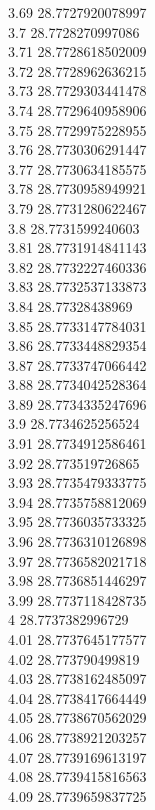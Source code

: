{3.69	28.7727920078997\\
3.7	28.7728270997086\\
3.71	28.7728618502009\\
3.72	28.7728962636215\\
3.73	28.7729303441478\\
3.74	28.7729640958906\\
3.75	28.7729975228955\\
3.76	28.7730306291447\\
3.77	28.7730634185575\\
3.78	28.7730958949921\\
3.79	28.7731280622467\\
3.8	28.7731599240603\\
3.81	28.7731914841143\\
3.82	28.7732227460336\\
3.83	28.7732537133873\\
3.84	28.77328438969\\
3.85	28.7733147784031\\
3.86	28.7733448829354\\
3.87	28.7733747066442\\
3.88	28.7734042528364\\
3.89	28.7734335247696\\
3.9	28.7734625256524\\
3.91	28.7734912586461\\
3.92	28.773519726865\\
3.93	28.7735479333775\\
3.94	28.7735758812069\\
3.95	28.7736035733325\\
3.96	28.7736310126898\\
3.97	28.7736582021718\\
3.98	28.7736851446297\\
3.99	28.7737118428735\\
4	28.7737382996729\\
4.01	28.7737645177577\\
4.02	28.773790499819\\
4.03	28.7738162485097\\
4.04	28.7738417664449\\
4.05	28.7738670562029\\
4.06	28.7738921203257\\
4.07	28.7739169613197\\
4.08	28.7739415816563\\
4.09	28.7739659837725\\
}

